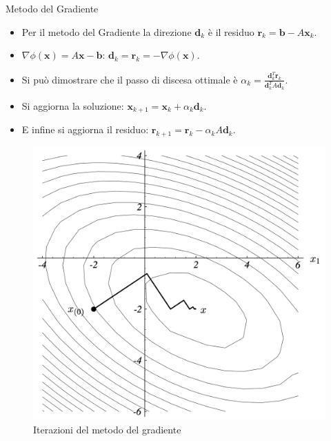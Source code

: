 \documentclass[10pt]{beamer}
\begin{document}
\begin{frame}{Metodo del Gradiente}

\begin{itemize}
    \item Per il metodo del Gradiente la direzione $\mathbf{d}_k$ è il residuo $\mathbf{r}_k =\mathbf{b}-A\mathbf{x}_k$.
    
    \item $\nabla\phi(\mathbf{x}) = A\mathbf{x} - \mathbf{b}$: $\mathbf{d}_k = \mathbf{r}_k = - \nabla\phi(\mathbf{x})$.
    
    \item Si può dimostrare che il passo di discesa ottimale è $\alpha_k=\frac{\mathbf{d}_k^T \mathbf{r}_k}{\mathbf{d}_k^T A \mathbf{d}_k}$.
    
    \item Si aggiorna la soluzione: $\mathbf{x}_{k+1}=\mathbf{x}_{k}+\alpha_k\mathbf{d}_{k}$.
    
    \item E infine si aggiorna il residuo: $\mathbf{r}_{k+1}=\mathbf{r}_{k}-\alpha_kA\mathbf{d}_{k}$.
\end{itemize}
\begin{figure}
    \centering
    \includegraphics[width=.25\linewidth]{cg_grad.png}
    \caption{Iterazioni del metodo del gradiente}
    \end{figure}    
\end{frame}
\end{document}
